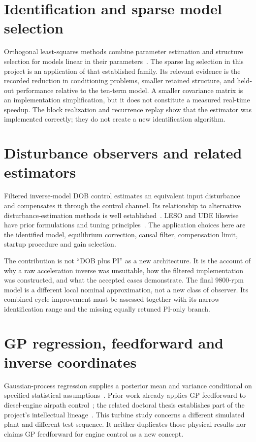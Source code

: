 \section{Identification and sparse model selection}
Orthogonal least-squares methods combine parameter estimation and structure selection for models linear in their parameters~\cite{ols}. The sparse lag selection in this project is an application of that established family. Its relevant evidence is the recorded reduction in conditioning problems, smaller retained structure, and held-out performance relative to the ten-term model. A smaller covariance matrix is an implementation simplification, but it does not constitute a measured real-time speedup. The block realization and recurrence replay show that the estimator was implemented correctly; they do not create a new identification algorithm.

\section{Disturbance observers and related estimators}
Filtered inverse-model DOB control estimates an equivalent input disturbance and compensates it through the control channel. Its relationship to alternative disturbance-estimation methods is well established~\cite{doboverview}. LESO and UDE likewise have prior formulations and tuning principles~\cite{gao,ude}. The application choices here are the identified model, equilibrium correction, causal filter, compensation limit, startup procedure and gain selection.

The contribution is not ``DOB plus PI'' as a new architecture. It is the account of why a raw acceleration inverse was unsuitable, how the filtered implementation was constructed, and what the accepted cases demonstrate. The final 9800-rpm model is a different local nominal approximation, not a new class of observer. Its combined-cycle improvement must be assessed together with its narrow identification range and the missing equally retuned PI-only branch.

\section{GP regression, feedforward and inverse coordinates}
Gaussian-process regression supplies a posterior mean and variance conditional on specified statistical assumptions~\cite{gpml}. Prior work already applies GP feedforward to diesel-engine airpath control~\cite{aran}; the related doctoral thesis establishes part of the project's intellectual lineage~\cite{aranthesis}. This turbine study concerns a different simulated plant and different test sequence. It neither duplicates those physical results nor claims GP feedforward for engine control as a new concept.


